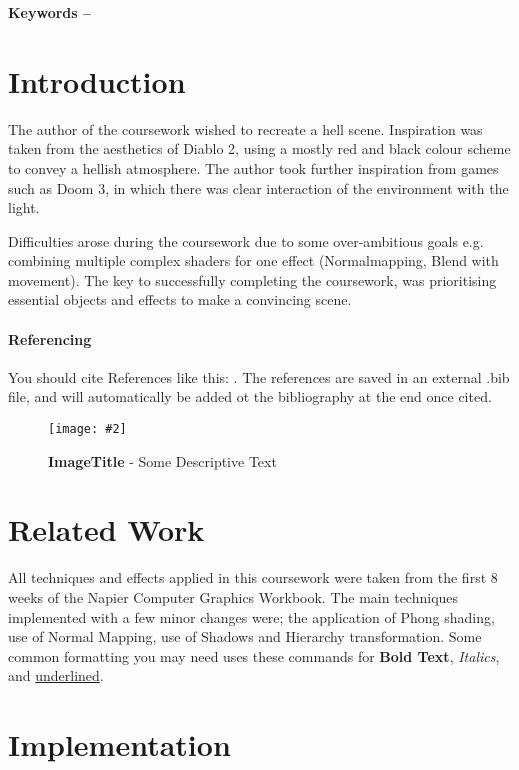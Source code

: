\documentclass[10pt, a4paper]{article}
\title{\mytitle}
\author{\myauthor\hspace{1em}\\\contact\\Edinburgh Napier University\hspace{0.5em}-\hspace{0.5em}\mymodule}
\date{}
\newcommand{\figuremacro}[5]{
    \begin{figure}[#1]
        \centering
        \texttt{[image: \#2]}
        \caption[#3]{\textbf{#3}#4}
        \label{fig:#2}
    \end{figure}
}
\begin{document}
	\maketitle
	\begin{abstract}
		Testing the POS git out
	\end{abstract}
    
	\textbf{Keywords -- }{\mykeywords}
	\section{Introduction}
	The author of the coursework wished to recreate a hell scene. Inspiration was taken from the aesthetics of Diablo 2, using a mostly red and black colour scheme to convey a hellish atmosphere. The author took further inspiration from games such as Doom 3, in which there was clear interaction of the environment with the light.
	
	Difficulties arose during the coursework due to some over-ambitious goals e.g. combining multiple complex shaders for one effect (Normalmapping, Blend with movement). The key to successfully completing the coursework, was prioritising essential objects and effects to make a convincing scene.
	
	
    \paragraph{Referencing}
    You should cite References like this: \cite{Keshav}. The references are saved in an external .bib file, and will automatically be added ot the bibliography at the end once cited.
    
    \figuremacro{h}{placeholder}{ImageTitle}{ - Some Descriptive Text}{1.0}
	
	\section{Related Work}
	All techniques and effects applied in this coursework were taken from the first 8 weeks of the Napier Computer Graphics Workbook. The main techniques implemented with a few minor changes were; the application of Phong shading, use of Normal Mapping, use of Shadows and Hierarchy transformation.
	Some common formatting you may need uses these commands for \textbf{Bold Text}, \textit{Italics}, and \underline{underlined}.
	
	\section{Implementation}
\end{document}
